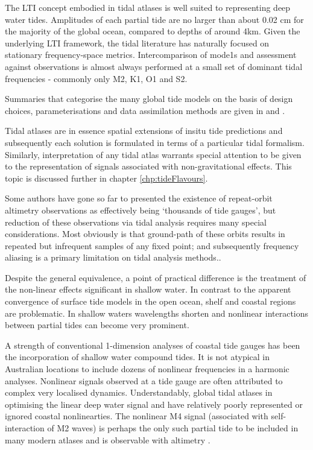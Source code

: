 The LTI concept embodied in tidal atlases is well suited to representing deep water tides.   Amplitudes of each partial tide are no larger than about 0.02 cm for the majority of the global ocean, compared to depths of around 4km.
Given the underlying LTI framework, the tidal literature has naturally focused on stationary frequency-space metrics.  Intercomparison of mode1s and assessment against observations is almost always performed at a small set of dominant tidal frequencies - commonly only M2, K1, O1 and S2.

Summaries that categorise the many global tide models on the basis of design choices, parameterisations and data assimilation methods are given in \citep{Ardalan:2008gs} and \citep{Matsumoto:2000tg}. 

Tidal atlases are in essence spatial extensions of insitu tide predictions and subsequently each solution is formulated in terms of a particular tidal formalism.  
Similarly, interpretation of any tidal atlas warrants special attention to be given to the representation of signals associated with non-gravitational effects.   This topic is discussed further in chapter \ref{chp:tideFlavours}.


Some authors have gone so far to presented the existence of repeat-orbit altimetry observations as effectively being `thousands of tide gauges', but reduction of these observations via tidal analysis requires many special considerations. Most obviously is that ground-path of these orbits results in repeated but infrequent samples of any fixed point; and subsequently frequency aliasing is a primary limitation on tidal analysis methods..



Despite the general equivalence, a point of practical difference is the treatment of the non-linear effects significant in shallow water.
In contrast to the apparent convergence of surface tide models in the open ocean, shelf and coastal regions are problematic.   In shallow waters wavelengths shorten and nonlinear interactions between partial tides can become very prominent. 


A strength of conventional 1-dimension analyses of coastal tide gauges has been the incorporation of shallow water compound tides.  It is not atypical in Australian locations to include dozens of nonlinear frequencies in a harmonic analyses.   Nonlinear signals observed at a tide gauge are often attributed to complex very localised dynamics.  
Understandably, global tidal atlases in optimising the linear deep water signal and have relatively poorly represented or ignored coastal nonlinearties.  The nonlinear M4 signal (associated with self-interaction of M2 waves) is perhaps the only such partial tide to be included in many modern atlases and is observable with altimetry \citep{Ray:2010jm}.


